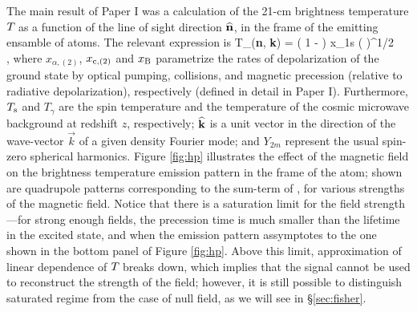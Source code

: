 The main result of Paper I was a calculation of the 21-cm brightness temperature $T_{\rm }$ as a function of the line of sight direction ${\bf{\widehat n}}$, in the frame of the emitting ensamble of atoms. The relevant expression is
\beq
\bga
   T_{\rm }({\bf{\widehat n}}, {\bf{\widehat k}}) = \left( 1 -  \right) x_{1{\rm s}} \left(  \right)^{1/2} \\
  \times {} \mbox{,} 
\ega
\label{eq:tbsoln}
\eeq
where $x_{\alpha, (2)}$, $x_{{\rm c}, (2)}$ and $x_{\rm B}$ parametrize the rates of depolarization of the ground state by optical pumping, collisions, and magnetic precession (relative to radiative depolarization), respectively (defined in detail in Paper I). Furthermore,  $T_{\rm s}$ and $T_\gamma$ are the spin temperature and the temperature of the cosmic microwave background at redshift $z$, respectively; $\bf{\widehat k}$ is a unit vector in the direction of the wave-vector $\vec k$ of a given density Fourier mode; and $Y_{2 m}$ represent the usual spin-zero spherical harmonics. Figure \ref{fig:hp} illustrates the effect of the magnetic field on the brightness temperature emission pattern in the frame of the atom; shown are quadrupole patterns corresponding to the sum-term of \eq{\ref{eq:tbsoln}}, for various strengths of the magnetic field. Notice that there is a saturation limit for the field strength---for strong enough fields, the precession time is much smaller than the lifetime in the excited state, and when the emission pattern assymptotes to the one shown in the bottom panel of Figure \ref{fig:hp}. Above this limit, approximation of linear dependence of $T_{\rm }$ breaks down, which implies that the signal cannot be used to reconstruct the strength of the field; however, it is still possible to distinguish saturated regime from the case of null field, as we will see in \S\ref{sec:fisher}.
